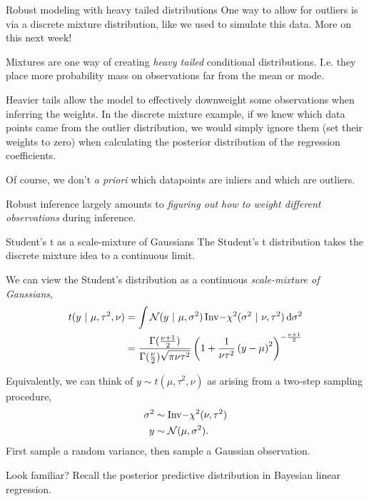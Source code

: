 \documentclass[aspectratio=169]{beamer}
\begin{document}
\begin{frame}{Robust modeling with heavy tailed distributions}
One way to allow for outliers is via a discrete mixture distribution, like we used to simulate this data. More on this next week!

Mixtures are one way of creating \textit{heavy tailed} conditional distributions. I.e. they place more probability mass on observations far from the mean or mode.

Heavier tails allow the model to effectively downweight some observations when inferring the weights. In the discrete mixture example, if we knew which data points came from the outlier distribution, we would simply ignore them (set their weights to zero) when calculating the posterior distribution of the regression coefficients.

Of course, we don't \textit{a priori} which datapoints are inliers and which are outliers.  

Robust inference largely amounts to \textit{figuring out how to weight different observations} during inference.

\end{frame}

\begin{frame}{Student's t as a scale-mixture of Gaussians}
The Student's t distribution takes the discrete mixture idea to a continuous limit.

We can view the Student's distribution as a continuous \textit{scale-mixture of Gaussians},
\begin{align}
    t(y ~\vert~ \mu, \tau^2, \nu) &= \int \mathcal{N}(y ~\vert~ \mu, \sigma^2) \, \mathrm{Inv-}\chi^2(\sigma^2 ~\vert~ \nu, \tau^2) \mathop{}\!\mathrm{d} \sigma^2 \\
    &= \frac {\Gamma ({\frac {\nu +1}{2}})}{\Gamma ({\frac {\nu }{2}}){\sqrt {\pi \nu \tau^2}}} \left(1+{\frac {1}{\nu \tau^2}}\left(y-\mu \right)^{2}\right)^{-{\frac {\nu +1}{2}}}
\end{align}

Equivalently, we can think of $y \sim t(\mu, \tau^2, \nu)$ as arising from a two-step sampling procedure,
\begin{align}
    \sigma^2 &\sim \mathrm{Inv-}\chi^2(\nu, \tau^2) \\
    y &\sim \mathcal{N}(\mu, \sigma^2).
\end{align}
First sample a random variance, then sample a Gaussian observation.

Look familiar? Recall the posterior predictive distribution in Bayesian linear regression.

\end{frame}
\end{document}
